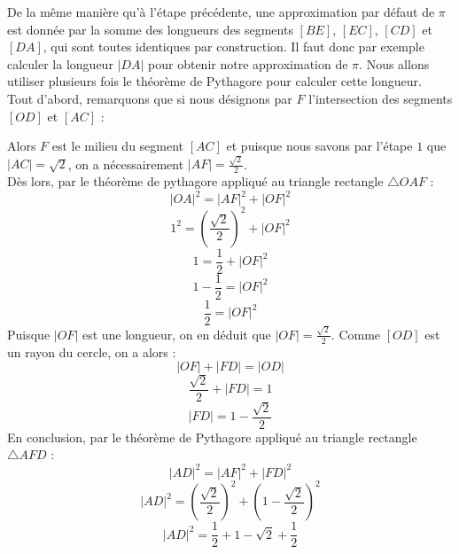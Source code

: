 \documentclass[a4paper,fontsize=13pt]{scrreprt}
\theoremstyle{plain}
\theoremstyle{definition}
\begin{document}
De la même manière qu'à l'étape précédente, une approximation par défaut de $\pi$ est donnée par la somme des longueurs des segments $[BE]$, $[EC]$, $[CD]$ et $[DA]$, qui sont toutes identiques par construction. Il faut donc par exemple calculer la longueur $|DA|$ pour obtenir notre approximation de $\pi$. Nous allons utiliser plusieurs fois le théorème de Pythagore pour calculer cette longueur. \\
Tout d'abord, remarquons que si nous désignons par $F$ l'intersection des segments $[OD]$ et $[AC]$ :
\begin{center}
\end{center}
Alors $F$ est le milieu du segment $[AC]$ et puisque nous savons par l'étape $1$ que $|AC| = \sqrt{2}$, on a nécessairement $|AF| = \frac{\sqrt{2}}{2}$. \\
Dès lors, par le théorème de pythagore appliqué au triangle rectangle $\triangle OAF$ :
$${|OA|}^2 = {|AF|}^2 + {|OF|}^2$$
$$1^2 = \left(\frac{\sqrt{2}}{2}\right)^2 + {|OF|}^2$$
$$1 = \frac{1}{2} + {|OF|}^2$$
$$1-\frac{1}{2} = {|OF|}^2$$
$$\frac{1}{2} = {|OF|}^2$$
Puisque $|OF|$ est une longueur, on en déduit que $|OF| = \frac{\sqrt{2}}{2}$. Comme $[OD]$ est un rayon du cercle, on a alors :
$$|OF| + |FD| = |OD|$$
$$\frac{\sqrt{2}}{2} + |FD| = 1$$
$$|FD| = 1-\frac{\sqrt{2}}{2}$$
En conclusion, par le théorème de Pythagore appliqué au triangle rectangle $\triangle AFD$ :
$${|AD|}^2 = {|AF|}^2 + {|FD|}^2$$
$${|AD|}^2 = \left(\frac{\sqrt{2}}{2}\right)^2 + \left(1-\frac{\sqrt{2}}{2}\right)^2$$
$${|AD|}^2 = \frac{1}{2} + 1-\sqrt{2}+\frac{1}{2}$$
\end{document}
